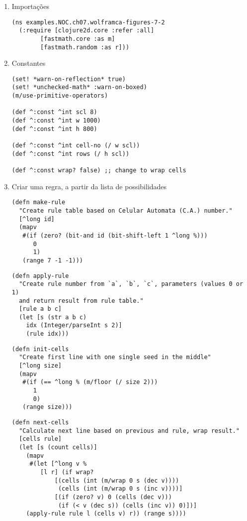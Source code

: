 \documentclass[11pt]{article}
\begin{document}
\begin{enumerate}
\item Importações
\label{sec:org5f08342}
\begin{verbatim}
(ns examples.NOC.ch07.wolframca-figures-7-2
  (:require [clojure2d.core :refer :all]
	    [fastmath.core :as m]
	    [fastmath.random :as r]))
\end{verbatim}

\item Constantes
\label{sec:orgf013d7a}
\begin{verbatim}
(set! *warn-on-reflection* true)
(set! *unchecked-math* :warn-on-boxed)
(m/use-primitive-operators)

(def ^:const ^int scl 8)
(def ^:const ^int w 1000)
(def ^:const ^int h 800)

(def ^:const ^int cell-no (/ w scl))
(def ^:const ^int rows (/ h scl))

(def ^:const wrap? false) ;; change to wrap cells
\end{verbatim}

\item Criar uma regra, a partir da lista de possibilidades
\label{sec:org0e1f84a}
\begin{verbatim}
(defn make-rule
  "Create rule table based on Celular Automata (C.A.) number."
  [^long id]
  (mapv
   #(if (zero? (bit-and id (bit-shift-left 1 ^long %)))
      0
      1)
   (range 7 -1 -1)))
\end{verbatim}

\begin{verbatim}
(defn apply-rule
  "Create rule number from `a`, `b`, `c`, parameters (values 0 or 1)
  and return result from rule table."
  [rule a b c]
  (let [s (str a b c)
	idx (Integer/parseInt s 2)]
    (rule idx)))
\end{verbatim}

\begin{verbatim}
(defn init-cells
  "Create first line with one single seed in the middle"
  [^long size]
  (mapv
   #(if (== ^long % (m/floor (/ size 2)))
      1
      0)
   (range size)))
\end{verbatim}

\begin{verbatim}
(defn next-cells
  "Calculate next line based on previous and rule, wrap result."
  [cells rule]
  (let [s (count cells)]
    (mapv
     #(let [^long v %                 
	    [l r] (if wrap?
		    [(cells (int (m/wrap 0 s (dec v))))
		     (cells (int (m/wrap 0 s (inc v))))]
		    [(if (zero? v) 0 (cells (dec v)))
		     (if (< v (dec s)) (cells (inc v)) 0)])]
	(apply-rule rule l (cells v) r)) (range s))))
\end{verbatim}


\end{enumerate}
\end{document}
